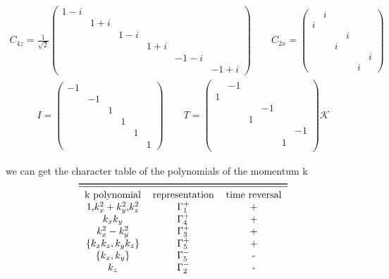 \documentclass[5pt]{article}
\begin{document}
\begin{normalsize}
\begin{align}
	C_{4z}=
	\frac{1}{\sqrt{2}}
	\begin{pmatrix}
		1-i&&&&&\\
		&1+i&&&&\\
		&&1-i&&&\\
		&&&1+i&&\\
		&&&&-1-i&\\
		&&&&&-1+i
	\end{pmatrix}
\qquad
C_{2x}=\begin{pmatrix}
	&i&&&&\\
	i&&&&&\\
	&&&i&&\\
	&&i&&&\\
	&&&&&i\\
	&&&&i&
\end{pmatrix}
\end{align}
\begin{align}
	I=\begin{pmatrix}
		-1&&&&&\\
		&-1&&&&\\
		&&1&&&\\
		&&&1&&\\
		&&&&1&\\
		&&&&&1
	\end{pmatrix}
\qquad
T=
\begin{pmatrix}
&-1&&&&\\
1&&&&&\\
&&&-1&&\\
&&1&&&\\
&&&&&-1\\
&&&&1&\\	
\end{pmatrix}
\mathcal{K}
\end{align}
\end{normalsize}
we can get the character table of the polynomials
of the momentum k
\begin{align}
	\nonumber
	\begin{tabular}{ccc}
		\toprule
		\midrule
		k polynomial & representation & time reversal \\
		1,$k_x^2+k_y^2$,$k_z^2$ &$\Gamma_1^{+}$&+\\
		$k_xk_y$&$\Gamma_4^{+}$&+\\
		$k_x^2-k_y^2$&$\Gamma_3^{+}$&+\\
		$\{k_xk_z,k_yk_z\}$&$\Gamma_5^{+}$&+\\
		$\{k_x,k_y\}$&$\Gamma_5^{-}$&-\\
		$k_z$&$\Gamma_2^{-}$&-
	\end{tabular}
\end{align}
\end{document}
